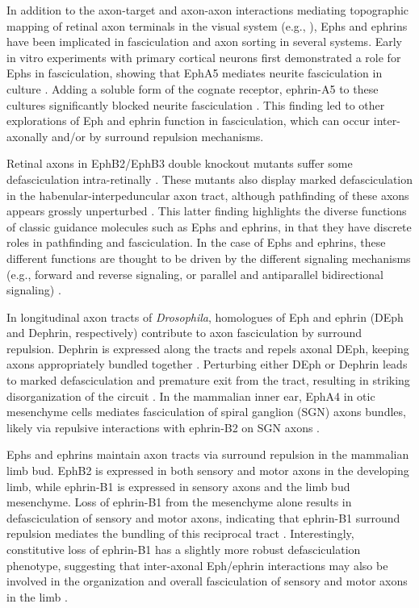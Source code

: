 \label{sec:EphFascic}
In addition to the axon-target and axon-axon interactions mediating topographic mapping of retinal axon terminals in the visual system (e.g., ), Ephs and ephrins have been implicated in fasciculation and axon sorting in several systems.
Early in vitro experiments with primary cortical neurons first demonstrated a role for Ephs in fasciculation, showing that EphA5 mediates neurite fasciculation in culture \cite{winslow1995cloning}.
Adding a soluble form of the cognate receptor, ephrin-A5 to these cultures significantly blocked neurite fasciculation \cite{winslow1995cloning}.
This finding led to other explorations of Eph and ephrin function in fasciculation, which can occur inter-axonally and/or by surround repulsion mechanisms.

Retinal axons in EphB2/EphB3 double knockout mutants suffer some defasciculation intra-retinally \cite{birgbauer2000kinase}.
These mutants also display marked defasciculation in the habenular-interpeduncular axon tract, although pathfinding of these axons appears grossly unperturbed \cite{orioli1996sek4}.
This latter finding highlights the diverse functions of classic guidance molecules such as Ephs and ephrins, in that they have discrete roles in pathfinding and fasciculation.
In the case of Ephs and ephrins, these different functions are thought to be driven by the different signaling mechanisms (e.g., forward and reverse signaling, or parallel and antiparallel bidirectional signaling) \cite{egea2007bidirectional,kania2016mechanisms}.

In longitudinal axon tracts of \emph{Drosophila}, homologues of Eph and ephrin (DEph and Dephrin, respectively) contribute to axon fasciculation by surround repulsion.
Dephrin is expressed along the tracts and repels axonal DEph, keeping axons appropriately bundled together \cite{bossing2002dephrin}.
Perturbing either DEph or Dephrin leads to marked defasciculation and premature exit from the tract, resulting in striking disorganization of the circuit \cite{bossing2002dephrin}.
In the mammalian inner ear, EphA4 in otic mesenchyme cells mediates fasciculation of spiral ganglion (SGN) axons bundles, likely via repulsive interactions with ephrin-B2 on SGN axons \cite{coate2012otic}.

Ephs and ephrins maintain axon tracts via surround repulsion in the mammalian limb bud.
EphB2 is expressed in both sensory and motor axons in the developing limb, while ephrin-B1 is expressed in sensory axons and the limb bud mesenchyme.
Loss of ephrin-B1 from the mesenchyme alone results in defasciculation of sensory and motor axons, indicating that ephrin-B1 surround repulsion mediates the bundling of this reciprocal tract \cite{luxey2013eph}.
Interestingly, constitutive loss of ephrin-B1 has a slightly more robust defasciculation phenotype, suggesting that inter-axonal Eph/ephrin interactions may also be involved in the organization and overall fasciculation of sensory and motor axons in the limb \cite{luxey2013eph}.

